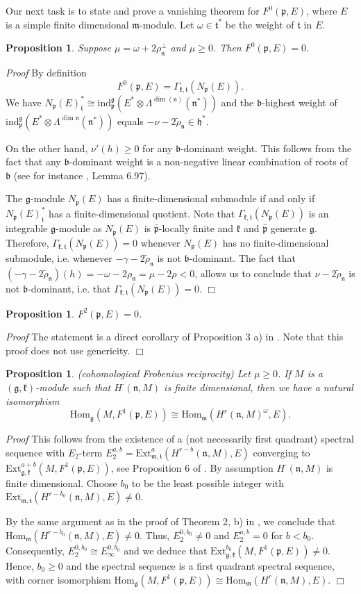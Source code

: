 \documentclass[11pt]{amsart}
\newcounter{theorem}
\newtheorem{prop}[theo]{Proposition}
\renewenvironment{proof}{ \emph{Proof}}{$\Box$}
\renewcommand{\tt}{\mathfrak{t}}
\newcommand{\kk}{\mathfrak{k}}
\newcommand{\nn}{\mathfrak{n}}
\newcommand{\mm}{\mathfrak{m}}
\newcommand{\hh}{\mathfrak{h}}
\newcommand{\pp}{\mathfrak{p}}
\renewcommand{\gg}{\mathfrak{g}}
\newcommand{\bb}{\mathfrak{b}}
\newcommand{\ind}{\mathrm{ind}}
\newcommand{\Hom}{\mathrm{Hom}}
\newcommand{\Ext}{\mathrm{Ext}}
\begin{document}
Our next task is to state and prove a vanishing theorem for $F^0(\pp,E)$, where $E$ is a simple finite dimensional $\mm$-module. Let $\omega\in\tt^*$ be the weight of $\tt$ in $E$. 
\begin{prop}\label{pr5.3}
Suppose $\mu=\omega+2\rho_\nn^\perp$ and $\mu\geq 0$. Then $F^0(\pp,E)=0$.
\end{prop}
\begin{proof}
By definition 
\[
F^0(\pp,E)=\Gamma_{\kk,\tt}(N_\pp(E)).
\]
We have $N_\pp(E)_\tt^*\cong\ind_\pp^\gg(E^*\otimes\Lambda^{\dim(\nn)}(\nn^*))$ and the $\bb$-highest weight of $\ind_\pp^\gg(E^*\otimes\Lambda^{\dim\nn}(\nn^*))$ equals $-\nu -2\tilde{\rho}_\nn\in\hh^*$.

On the other hand, $\nu '(h)\geq 0$ for any $\bb$-dominant weight. This follows from the fact that any $\bb$-dominant weight is a non-negative linear combination of roots of $\bb$ (see for instance \cite{Kn}, Lemma 6.97).

The $\gg$-module $N_\pp(E)$ has a finite-dimensional submodule if and only if $N_\pp(E)_\tt^*$ has a finite-dimensional quotient. Note that $\Gamma_{\kk,\tt}(N_\pp(E))$ is an integrable $\gg$-module as $N_\pp(E)$ is $\bar{\pp}$-locally finite and $\kk$ and $\bar{\pp}$ generate $\gg$. Therefore, $\Gamma_{\kk,\tt}(N_\pp(E))=0$ whenever $N_\pp(E)$ has no finite-dimensional submodule, i.e. whenever $-\gamma-2\tilde{\rho}_\nn$ is not $\bb$-dominant. The fact that $(-\gamma-2\tilde{\rho}_\nn)(h)=-\omega-2\rho_\nn=\mu-2\rho <0$, allows us to conclude that $\nu-2\tilde{\rho}_\nn$ is not $\bb$-dominant, i.e. that $\Gamma_{\kk,\tt}(N_\pp(E))=0$.
\end{proof}
\begin{prop}\label{pr5.4}
$F^2(\pp,E)=0$. 
\end{prop}
\begin{proof}
The statement is a direct corollary of Proposition 3 a) in \cite{PZ2}. Note that this proof does not use genericity.
\end{proof}
\begin{prop}\label{pr5.5}(cohomological Frobenius reciprocity) Let $\mu\geq 0$. If $M$ is a $(\gg,\kk)$-module such that $H^\cdot(\nn,M)$ is finite dimensional, then we have a natural isomorphism $$\Hom_\gg(M,F^1(\pp,E))\cong\Hom_\mm(H^r(\nn,M)^\omega,E).$$
\end{prop}
\begin{proof}
This follows from the existence of a (not necessarily first quadrant) spectral sequence with $E_2$-term 
$E_2^{a,b}=\Ext_{\mm,\tt}^a(H^{r-b}(\nn,M),E)$ converging to $\Ext_{\gg,\kk}^{a+b}(M,F^1(\pp,E))$, see Proposition 6 of \cite{PZ2}. By assumption $H^\cdot(\nn,M)$  is finite dimensional. Choose $b_0$ to be the least possible integer with $\Ext^\cdot_{\mm,\tt}(H^{r-b_0}(\nn,M),E)\neq 0$. 

By the same argument as in the proof of Theorem 2, b) in \cite{PZ2}, we conclude that $\Hom_\mm(H^{r-b_0}(\nn,M),E)\neq 0$. Thus, $E_2^{0,b_0}\neq 0$ and $E_2^{a,b}=0$ for $b<b_0$. Consequently, $E_2^{0,b_0}\cong E_\infty^{0,b_0}$ and we deduce that $\Ext_{\gg,\kk}^{b_0}(M,F^1(\pp,E))\neq 0$. Hence, $b_0\geq 0$ and the spectral sequence is a  first quadrant spectral sequence, with corner isomorphism $\Hom_\gg(M,F^1(\pp,E))\cong\Hom_\mm(H^r(\nn,M),E)$.
\end{proof}
\end{document}
